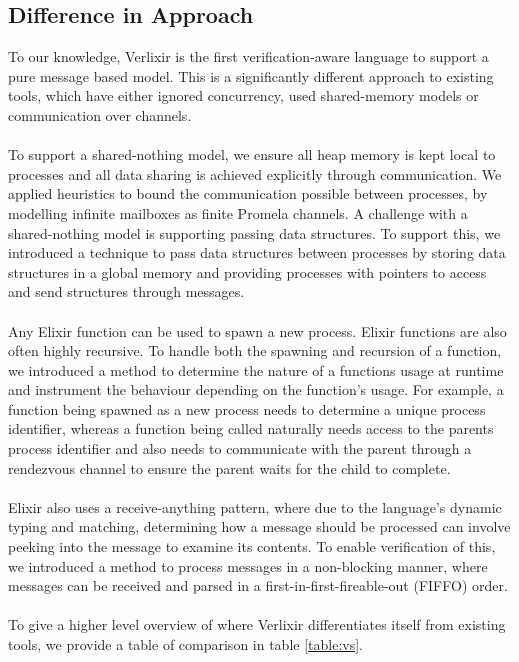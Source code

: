 \subsection{Difference in Approach}
To our knowledge, Verlixir is the first verification-aware language to support a pure message based model. This is a significantly different approach to existing tools, which have either ignored concurrency, used shared-memory models or communication over channels. 
\\ \\
To support a shared-nothing model, we ensure all heap memory is kept local to processes and all data sharing is achieved explicitly through communication. We applied heuristics to bound the communication possible between processes, by modelling infinite mailboxes as finite Promela channels. A challenge with a shared-nothing model is supporting passing data structures. To support this, we introduced a technique to pass data structures between processes by storing data structures in a global memory and providing processes with pointers to access and send structures through messages. 
\\ \\
Any Elixir function can be used to spawn a new process. Elixir functions are also often highly recursive. To handle both the spawning and recursion of a function, we introduced a method to determine the nature of a functions usage at runtime and instrument the behaviour depending on the function's usage. For example, a function being spawned as a new process needs to determine a unique process identifier, whereas a function being called naturally needs access to the parents process identifier and also needs to communicate with the parent through a rendezvous channel to ensure the parent waits for the child to complete.
\\ \\
Elixir also uses a receive-anything pattern, where due to the language's dynamic typing and matching, determining how a message should be processed can involve peeking into the message to examine its contents. To enable verification of this, we introduced a method to process messages in a non-blocking manner, where messages can be received and parsed in a first-in-first-fireable-out (FIFFO) order.
\\ \\
To give a higher level overview of where Verlixir differentiates itself from existing tools, we provide a table of comparison in table \ref{table:vs}.

